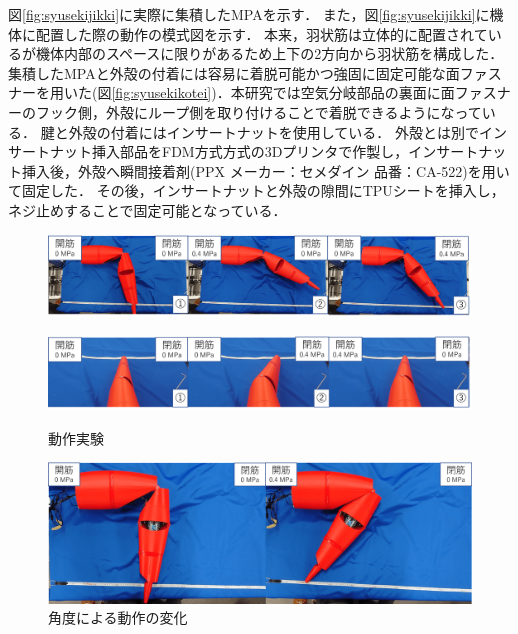 図\ref{fig:syusekijikki}に実際に集積したMPAを示す．
また，図\ref{fig:syusekijikki}に機体に配置した際の動作の模式図を示す．
本来，羽状筋は立体的に配置されているが機体内部のスペースに限りがあるため上下の2方向から羽状筋を構成した．
集積したMPAと外殻の付着には容易に着脱可能かつ強固に固定可能な面ファスナーを用いた(図\ref{fig:syusekikotei})．本研究では空気分岐部品の裏面に面ファスナーのフック側，外殻にループ側を取り付けることで着脱できるようになっている．
腱と外殻の付着にはインサートナットを使用している．
外殻とは別でインサートナット挿入部品をFDM方式方式の3Dプリンタで作製し，インサートナット挿入後，外殻へ瞬間接着剤(PPX メーカー：セメダイン 品番：CA-522)を用いて固定した．
その後，インサートナットと外殻の隙間にTPUシートを挿入し，ネジ止めすることで固定可能となっている．
\begin{figure}[tbp]
  \begin{minipage}{1\hsize}
    \centering
    \includegraphics[scale=0.12]{image/move1all.png}
    \label{fig:move1all}
  \end{minipage}
  \begin{minipage}{1\hsize}
    \centering
    \includegraphics[scale=0.12]{image/move2all.png}
    \label{fig:move2all}
  \end{minipage}
%
  \caption{動作実験}
  \label{fig:moveall}
\end{figure}
\begin{figure}[t]
    \centering
    \includegraphics[scale=0.12]{image/kousatu1.png}
    \caption{角度による動作の変化}
    \label{fig:kousatu1}
\end{figure}
